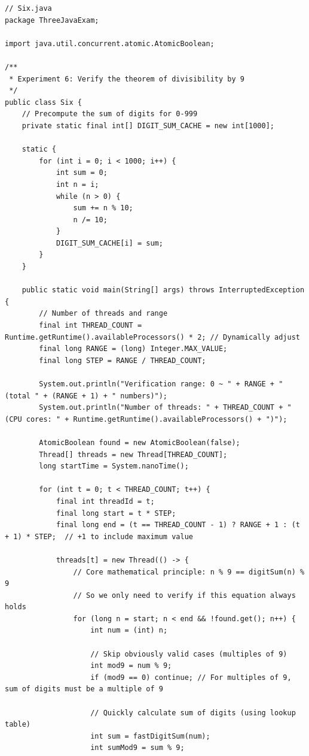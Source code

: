 \documentclass[12pt,a4paper]{article}
\begin{document}
\begin{lstlisting}
// Six.java
package ThreeJavaExam;

import java.util.concurrent.atomic.AtomicBoolean;

/**
 * Experiment 6: Verify the theorem of divisibility by 9
 */
public class Six {  
    // Precompute the sum of digits for 0-999
    private static final int[] DIGIT_SUM_CACHE = new int[1000];
    
    static {
        for (int i = 0; i < 1000; i++) {
            int sum = 0;
            int n = i;
            while (n > 0) {
                sum += n % 10;
                n /= 10;
            }
            DIGIT_SUM_CACHE[i] = sum;
        }
    }

    public static void main(String[] args) throws InterruptedException {
        // Number of threads and range
        final int THREAD_COUNT = Runtime.getRuntime().availableProcessors() * 2; // Dynamically adjust
        final long RANGE = (long) Integer.MAX_VALUE;
        final long STEP = RANGE / THREAD_COUNT;

        System.out.println("Verification range: 0 ~ " + RANGE + " (total " + (RANGE + 1) + " numbers)");
        System.out.println("Number of threads: " + THREAD_COUNT + " (CPU cores: " + Runtime.getRuntime().availableProcessors() + ")");

        AtomicBoolean found = new AtomicBoolean(false);
        Thread[] threads = new Thread[THREAD_COUNT];
        long startTime = System.nanoTime();

        for (int t = 0; t < THREAD_COUNT; t++) {
            final int threadId = t;
            final long start = t * STEP;
            final long end = (t == THREAD_COUNT - 1) ? RANGE + 1 : (t + 1) * STEP;  // +1 to include maximum value

            threads[t] = new Thread(() -> {
                // Core mathematical principle: n % 9 == digitSum(n) % 9
                // So we only need to verify if this equation always holds
                for (long n = start; n < end && !found.get(); n++) {
                    int num = (int) n;
                    
                    // Skip obviously valid cases (multiples of 9)
                    int mod9 = num % 9;
                    if (mod9 == 0) continue; // For multiples of 9, sum of digits must be a multiple of 9
                    
                    // Quickly calculate sum of digits (using lookup table)
                    int sum = fastDigitSum(num);
                    int sumMod9 = sum % 9;
                    

\end{lstlisting}
\end{document}
